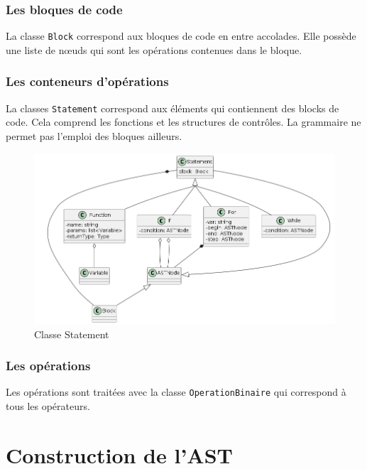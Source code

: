 \documentclass[a4paper]{article}%
\begin{document}
\subsubsection{Les bloques de code}

La classe \lstinline{Block} correspond aux bloques de code en entre accolades.
Elle possède une liste de nœuds qui sont les opérations contenues dans le
bloque.

\subsubsection{Les conteneurs d'opérations}

La classes \lstinline{Statement} correspond aux éléments qui contiennent des
blocks de code. Cela comprend les fonctions et les structures de contrôles. La
grammaire ne permet pas l'emploi des bloques ailleurs.

\begin{figure}[h]
  \begin{center}
  \includegraphics[scale=0.5]{../ressources/diagrams/stmts.png}
  \caption{Classe Statement}
  \end{center}
\end{figure}
\subsubsection{Les opérations}

Les opérations sont traitées avec la classe \lstinline{OperationBinaire} qui
correspond à tous les opérateurs.



\section{Construction de l'AST}
\end{document}
